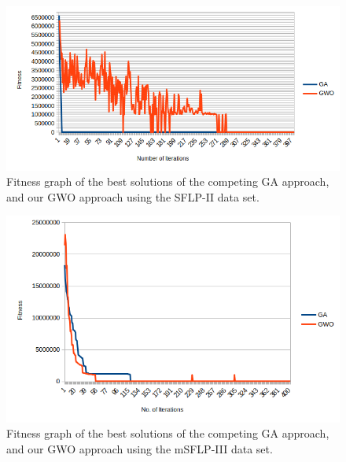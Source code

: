 \begin{figure}[h!]
\centering
\begin{adjustwidth}{-0.9in}{}
\includegraphics[scale=0.75]{./images/chap07-rd/gwo-sflp2-graph.png}
\end{adjustwidth}
\caption{Fitness graph of the best solutions of the competing GA approach, and our GWO approach using the SFLP-II data set.}
\label{graph-ga-vs-gwo-sflp2}
\end{figure}

\begin{figure}[h!]
\centering
\begin{adjustwidth}{-0.1in}{}
\includegraphics[scale=0.65]{./images/chap07-rd/gwo-msflp3-graph.png}
\end{adjustwidth}
\caption{Fitness graph of the best solutions of the competing GA approach, and our GWO approach using the mSFLP-III data set.}
\label{graph-ga-vs-gwo-msflp3}
\end{figure}


